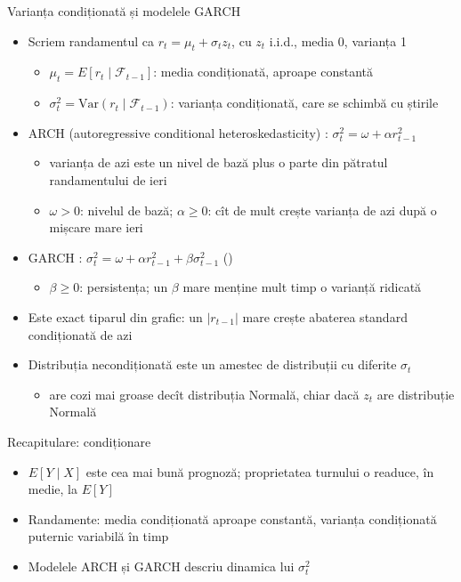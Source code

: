 \begin{frame}{Varianța condiționată și modelele GARCH}
\itemsize{\footnotesize}
\begin{itemize}
    \item Scriem randamentul ca $r_t = \mu_t + \sigma_t z_t$, cu $z_t$ i.i.d., media 0, varianța 1
    \begin{itemize}
        \item $\mu_t = E[r_t \mid \mathcal{F}_{t-1}]$: media condiționată, aproape constantă
        \item $\sigma_t^2 = \text{Var}(r_t \mid \mathcal{F}_{t-1})$: varianța condiționată, care se schimbă cu știrile
    \end{itemize}
    \item ARCH (autoregressive conditional heteroskedasticity) : $\sigma_t^2 = \omega + \alpha r_{t-1}^2$
    \begin{itemize}
        \item varianța de azi este un nivel de bază plus o parte din pătratul randamentului de ieri
        \item $\omega > 0$: nivelul de bază; $\alpha \ge 0$: cît de mult crește varianța de azi după o mișcare mare ieri
    \end{itemize}
    \item GARCH : $\sigma_t^2 = \omega + \alpha r_{t-1}^2 + \beta\sigma_{t-1}^2$ ()
    \begin{itemize}
        \item $\beta \ge 0$: persistența; un $\beta$ mare menține mult timp o varianță ridicată
    \end{itemize}
    \item Este exact tiparul din grafic: un $|r_{t-1}|$ mare crește abaterea standard condiționată de azi
    \item Distribuția necondiționată este un amestec de distribuții cu diferite $\sigma_t$
    \begin{itemize}
        \item are cozi mai groase decît distribuția Normală, chiar dacă $z_t$ are distribuție Normală
    \end{itemize}
\end{itemize}
\end{frame}

\begin{frame}{Recapitulare: condiționare}
\itemsize{\small}
\begin{itemize}
    \item $E[Y \mid X]$ este cea mai bună prognoză; proprietatea turnului o readuce, în medie, la $E[Y]$
    \item Randamente: media condiționată aproape constantă, varianța condiționată puternic variabilă în timp
    \item Modelele ARCH și GARCH descriu dinamica lui $\sigma_t^2$
\end{itemize}
\end{frame}


